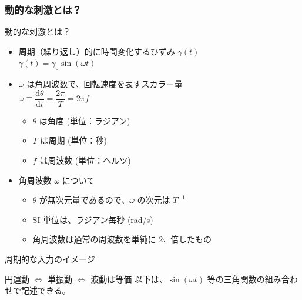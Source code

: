 \documentclass[12pt, dvipdfmx]{beamer}
\begin{document}
\begin{frame}
	\frametitle{動的な刺激とは？}
	\begin{block}{動的な刺激とは？}
		\begin{itemize}
			\item 周期（繰り返し）的に時間変化するひずみ $\gamma (t)$\\
			$\gamma (t) = \gamma_0 \sin(\omega t)$
			\item $\omega$ は角周波数で、回転速度を表すスカラー量\\
			$\omega \equiv \dfrac{\mathrm{d} \theta}{\mathrm{d} t} = \dfrac{2 \pi}{T} = 2\pi f$
			\begin{itemize}
				\item $\theta$ は角度 (単位：ラジアン)
				\item $T$ は周期 (単位：秒)
				\item $f$ は周波数 (単位：ヘルツ)
				
			\end{itemize}
			\item 角周波数 $\omega$ について
			\begin{itemize}
				\item $\theta$ が無次元量であるので、$\omega$ の次元は $T^{-1}$
				\item SI 単位は、ラジアン毎秒 (rad/s)
				\item 角周波数は通常の周波数を単純に $2\pi$ 倍したもの
			\end{itemize}
		\end{itemize}
	\end{block}

\end{frame}


\begin{frame}{周期的な入力のイメージ}
	\begin{exampleblock}{円運動 $\Leftrightarrow$ 単振動 $\Leftrightarrow$ 波動は等価}
		以下は、$\sin(\omega t)$ 等の三角関数の組み合わせで記述できる。

		\vspace{3mm}
		\centering
	\end{exampleblock}
\end{frame}
\end{document}
